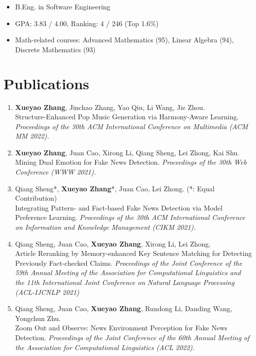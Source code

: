 \documentclass{resume}
\begin{document}
{
  \small 
\begin{itemize}
  \item B.Eng. in Software Engineering
  \item GPA: 3.83 / 4.00, Ranking: 4 / 246 (Top 1.6\%)
  \item Math-related courses: Advanced Mathematics (95), Linear Algebra (94), Discrete Mathematics (93)
\end{itemize}
}


\section{Publications}

\begin{enumerate}\itemsep 0.5em
  \item \textbf{Xueyao Zhang}, Jinchao Zhang, Yao Qiu, Li Wang, Jie Zhou.\\Structure-Enhanced Pop Music Generation via Harmony-Aware Learning. \textit{Proceedings of the 30th ACM International Conference on Multimedia (ACM MM 2022).}
  \item \textbf{Xueyao Zhang}, Juan Cao, Xirong Li, Qiang Sheng, Lei Zhong, Kai Shu.\\Mining Dual Emotion for Fake News Detection. \textit{Proceedings of the 30th Web Conference (WWW 2021).}
  \item Qiang Sheng*, \textbf{Xueyao Zhang}*, Juan Cao, Lei Zhong.  (*: Equal Contribution)\\Integrating Pattern- and Fact-based Fake News Detection via Model Preference Learning. \textit{Proceedings of the 30th ACM International Conference on Information and Knowledge Management (CIKM 2021).}
  \item Qiang Sheng, Juan Cao, \textbf{Xueyao Zhang}, Xirong Li, Lei Zhong.\\Article Reranking by Memory-enhanced Key Sentence Matching for Detecting Previously Fact-checked Claims. \textit{Proceedings of the Joint Conference of the 59th Annual Meeting of the Association for Computational Linguistics and the 11th International Joint Conference on Natural Language Processing (ACL-IJCNLP 2021) }
  \item Qiang Sheng, Juan Cao, \textbf{Xueyao Zhang}, Rundong Li, Danding Wang, Yongchun Zhu.\\Zoom Out and Observe: News Environment Perception for Fake News Detection. \textit{Proceedings of the Joint Conference of the 60th Annual Meeting of the Association for Computational Linguistics (ACL 2022).}
\end{enumerate}
\end{document}
